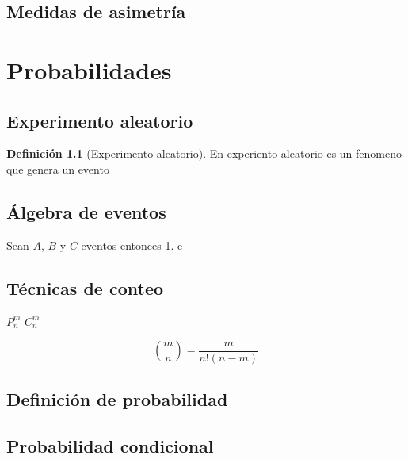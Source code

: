 \documentclass[
  10pt,
]{krantz}
\theoremstyle{definition}
\newtheorem{definition}{Definición}[chapter]
\theoremstyle{definition}
\theoremstyle{definition}
\theoremstyle{definition}
\theoremstyle{remark}
\begin{document}
\hypertarget{medidas-de-asimetruxeda}{%
\chapter{Medidas de asimetría}\label{medidas-de-asimetruxeda}}

\hypertarget{part-probabilidades}{%
\part{Probabilidades}\label{part-probabilidades}}

\hypertarget{experimento-aleatorio}{%
\chapter{Experimento aleatorio}\label{experimento-aleatorio}}

\begin{definition}[Experimento aleatorio]
\protect\hypertarget{def:unnamed-chunk-8}{}{\label{def:unnamed-chunk-8} {} }En experiento aleatorio es un fenomeno que genera un evento
\end{definition}

\hypertarget{uxe1lgebra-de-eventos}{%
\chapter{Álgebra de eventos}\label{uxe1lgebra-de-eventos}}

Sean \(A\), \(B\) y \(C\) eventos entonces
1. e

\hypertarget{tuxe9cnicas-de-conteo}{%
\chapter{Técnicas de conteo}\label{tuxe9cnicas-de-conteo}}

\(P_n^m\)
\(C_n^m\)

\[\binom{m}{n}=\frac{m}{n!(n-m)}\]

\hypertarget{definiciuxf3n-de-probabilidad}{%
\chapter{Definición de probabilidad}\label{definiciuxf3n-de-probabilidad}}

\hypertarget{probabilidad-condicional}{%
\chapter{Probabilidad condicional}\label{probabilidad-condicional}}
\end{document}
